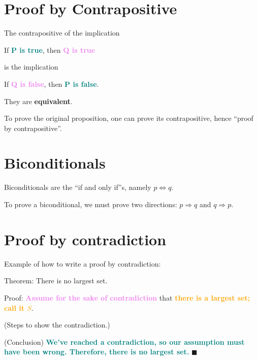 \documentclass[12pt, letterpaper, oneside]{book}
\begin{document}
\section{Proof by Contrapositive}

The contrapositive of the implication

\begin{displayquote}
  If \textbf{\textcolor{teal}{P is true}}, then \textbf{\textcolor{violet}{Q is
      true}}
\end{displayquote}

is the implication

\begin{displayquote}
  If \textbf{\textcolor{violet}{Q is false}}, then \textbf{\textcolor{teal}{P
      is false}}.
\end{displayquote}

They are \textbf{equivalent}.

To prove the original proposition, one can prove its contrapositive, hence
``proof by contrapositive''.

\section{Biconditionals}

Biconditionals are the ``if and only if''s, namely $p \Leftrightarrow q$.

To prove a biconditional, we must prove two directions: $p \Rightarrow q$ and
$q \Rightarrow p$.

\section{Proof by contradiction}

Example of how to write a proof by contradiction:

\begin{displayquote}
  Theorem: There is no largest set.

  Proof: \textbf{\textcolor{violet}{Assume for the sake of contradiction}} that
  \textbf{\textcolor{orange}{there is a largest set; call it $S$}}.

  (Steps to show the contradiction.)

  (Conclusion) \textbf{\textcolor{teal}{We've reached a contradiction, so our
      assumption must have been wrong. Therefore, there is no largest set.}}
  $\blacksquare$
\end{displayquote}
\end{document}
